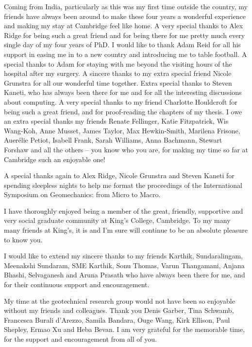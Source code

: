 \begin{acknowledgements}
Coming from India, particularly as this was my first time outside the country, 
my friends have always been around to make these four years a wonderful 
experience and making my stay at Cambridge feel like home. A very special 
thanks to Alex Ridge for being such a great friend 
and for being there for me pretty much every single day of my four years of 
PhD. I would like to thank Adam Reid for all his support in easing me in to a 
new country and introducing me to table football. A special thanks to Adam for 
staying with me beyond the visiting hours of the hospital after my surgery. A 
sincere thanks to my extra special friend Nicole Grunstra for all our 
wonderful time together. Extra special thanks to Steven Kaneti, who has always 
been there for me and for all the interesting discussions about computing. A 
very special thanks to my friend Charlotte Houldcroft for being such a great 
friend, and for proof-reading the chapters of my thesis. I owe 
an extra special 
thanks my friends Renate Fellinger, Katie Fitzpatrick, Wis Wang-Koh, Anne 
Musset, James Taylor, Max Hewkin-Smith, Marilena Frisone, Auer\'{e}lie Petiot, 
Isabell Frank, Sarah Williams, Anna Bachmann, Stewart Forshaw and all the 
others -- you know who you are, for making my time so far at Cambridge such an 
enjoyable one!

A special thanks again to Alex Ridge, Nicole Grunstra and Steven Kaneti for 
spending sleepless nights to help me format the proceedings of the 
International Symposium on Geomechanics: from Micro to Macro.

I have thoroughly enjoyed being a member of the great, friendly, supportive and 
very social graduate community at King's College, Cambridge. To my many many 
friends at King's, it is and I'm sure will continue to be an absolute pleasure 
to know you. %

I would like to extend my sincere thanks to my friends Karthik, Sundaralingam, 
Meenakshi Sundaram, SME Karthik, Sonu Thomas, Varun Thangamani, Anjana Bhashi,  
Selvaganesh and Aruna Prasath who have always been there for me, and for their 
continuous support and encouragement. 

My time at the geotechnical research group would not have been so enjoyable 
without my friends and colleagues. Thank you Denis Garber, Tina Schwamb, 
Francesca Burali d'Arezzo, Samila Bandara, Ouge Wang, Kirk Ellison, Paul 
Shepley, Ermao Xu and Heba Bevan. I am very grateful for the memorable time, 
for the support and 
encouragement from all of you.


\end{acknowledgements}
